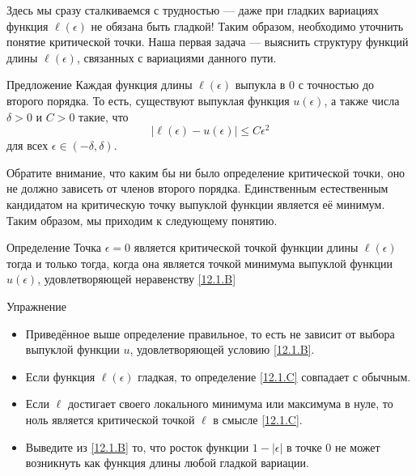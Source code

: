Здесь мы сразу сталкиваемся с трудностью — даже при гладких вариациях функция $\ell(\epsilon)$ не обязана быть гладкой!
Таким образом, необходимо уточнить понятие критической точки.
Наша первая задача — выяснить структуру функций длины
$\ell(\epsilon)$, связанных с вариациями данного пути. 


\begin{ex}{Предложение}\label{12.1.B}
Каждая функция длины $\ell(\epsilon)$ выпукла в $0$ с точностью до
второго порядка. 
То есть, существуют выпуклая функция $u(\epsilon)$, а также числа
$\delta > 0$ и $C > 0$ такие, что  
\[|\ell(\epsilon) - u(\epsilon)| \le C\epsilon^2\]
для всех $\epsilon \in (-\delta, \delta)$.
\end{ex}

Обратите внимание, что каким бы ни было определение критической точки,
оно не должно зависеть от членов второго порядка. 
Единственным естественным кандидатом на критическую точку выпуклой
функции является её минимум. 
Таким образом, мы приходим к следующему понятию.

\begin{ex}{Определение}\label{12.1.C}
Точка $\epsilon = 0$ является критической точкой функции длины $\ell(\epsilon)$ тогда и только тогда, когда она является точкой минимума выпуклой функции $u(\epsilon)$, удовлетворяющей неравенству \ref{12.1.B}
\end{ex}

\begin{ex}{Упражнение}\label{12.1.D}
\begin{itemize}

\item Приведённое выше определение правильное, то есть не зависит от выбора выпуклой функции $u$, удовлетворяющей условию \ref{12.1.B}.


\item Если функция $\ell(\epsilon)$ гладкая, то определение \ref{12.1.C} совпадает с обычным.


\item Если $\ell$ достигает своего локального минимума или максимума в
  нуле, то ноль является критической точкой $\ell$ в смысле
  \ref{12.1.C}. 


\item Выведите из \ref{12.1.B} то, что росток функции $1 - |\epsilon|$
  в точке $0$ не может возникнуть как функция длины любой гладкой
  вариации.
\end{itemize}
\end{ex}


